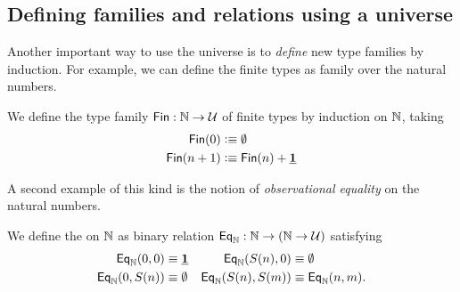 \subsection{Defining families and relations using a universe}
Another important way to use the universe is to \emph{define} new type families by induction. For example, we can define the finite types as family over the natural numbers.

\begin{defn}\label{defn:fin}
We define the type family $\mathsf{Fin}:\mathbb{N}\to\mathcal{U}$ of finite types by induction on $\mathbb{N}$, taking
\begin{align*}
\mathsf{Fin}(0) & \vcentcolon\equiv \emptyset \\
\mathsf{Fin}(n+1) & \vcentcolon\equiv \mathsf{Fin}(n)+\underline{\mathbf{1}}
\end{align*}
\end{defn}

A second example of this kind is the notion of \emph{observational equality} on the natural numbers.

\begin{defn}\label{defn:obs_nat}
We define the  on $\mathbb{N}$ as binary relation $\mathsf{Eq}_\mathbb{N}:\mathbb{N}\to(\mathbb{N}\to\mathcal{U})$ satisfying
\begin{align*}
\mathsf{Eq}_\mathbb{N}(0,0) & \equiv \underline{\mathbf{1}} & \mathsf{Eq}_\mathbb{N}(S(n),0) & \equiv \emptyset \\
\mathsf{Eq}_\mathbb{N}(0,S(n)) & \equiv \emptyset & \mathsf{Eq}_\mathbb{N}(S(n),S(m)) & \equiv \mathsf{Eq}_\mathbb{N}(n,m).
\end{align*}
\end{defn}

